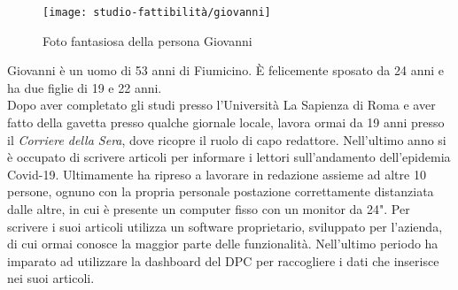 \begin{wrapfigure}{r}{8cm}
    \texttt{[image: studio-fattibilità/giovanni]}
    \caption{Foto fantasiosa della persona Giovanni}
\end{wrapfigure}

Giovanni è un uomo di 53 anni di Fiumicino. È felicemente sposato da 24 anni e ha due figlie di 19 e 22 anni.\\ 
Dopo aver completato gli studi presso l'Università La Sapienza di Roma e aver fatto della gavetta presso qualche giornale locale, lavora ormai da 19 anni presso il \textit{Corriere della Sera}, dove ricopre il ruolo di capo redattore. Nell'ultimo anno si è occupato di scrivere articoli per informare i lettori sull'andamento dell'epidemia Covid-19. Ultimamente ha ripreso a lavorare in redazione assieme ad altre 10 persone, ognuno con la propria personale postazione correttamente distanziata dalle altre, in cui è presente un computer fisso con un monitor da 24".
Per scrivere i suoi articoli utilizza un software proprietario, sviluppato per l'azienda, di cui ormai conosce la maggior parte delle funzionalità. Nell'ultimo periodo ha imparato ad utilizzare la dashboard del DPC per raccogliere i dati che inserisce nei suoi articoli.

